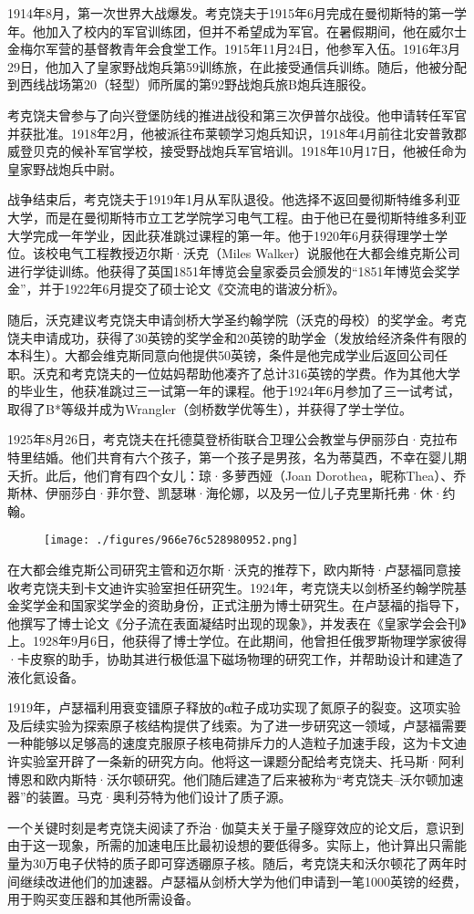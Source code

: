 1914年8月，第一次世界大战爆发。考克饶夫于1915年6月完成在曼彻斯特的第一学年。他加入了校内的军官训练团，但并不希望成为军官。在暑假期间，他在威尔士金梅尔军营的基督教青年会食堂工作。1915年11月24日，他参军入伍。1916年3月29日，他加入了皇家野战炮兵第59训练旅，在此接受通信兵训练。随后，他被分配到西线战场第20（轻型）师所属的第92野战炮兵旅B炮兵连服役。

考克饶夫曾参与了向兴登堡防线的推进战役和第三次伊普尔战役。他申请转任军官并获批准。1918年2月，他被派往布莱顿学习炮兵知识，1918年4月前往北安普敦郡威登贝克的候补军官学校，接受野战炮兵军官培训。1918年10月17日，他被任命为皇家野战炮兵中尉。

战争结束后，考克饶夫于1919年1月从军队退役。他选择不返回曼彻斯特维多利亚大学，而是在曼彻斯特市立工艺学院学习电气工程。由于他已在曼彻斯特维多利亚大学完成一年学业，因此获准跳过课程的第一年。他于1920年6月获得理学士学位。该校电气工程教授迈尔斯·沃克（Miles Walker）说服他在大都会维克斯公司进行学徒训练。他获得了英国1851年博览会皇家委员会颁发的“1851年博览会奖学金”，并于1922年6月提交了硕士论文《交流电的谐波分析》。

随后，沃克建议考克饶夫申请剑桥大学圣约翰学院（沃克的母校）的奖学金。考克饶夫申请成功，获得了30英镑的奖学金和20英镑的助学金（发放给经济条件有限的本科生）。大都会维克斯同意向他提供50英镑，条件是他完成学业后返回公司任职。沃克和考克饶夫的一位姑妈帮助他凑齐了总计316英镑的学费。作为其他大学的毕业生，他获准跳过三一试第一年的课程。他于1924年6月参加了三一试考试，取得了B*等级并成为Wrangler（剑桥数学优等生），并获得了学士学位。

1925年8月26日，考克饶夫在托德莫登桥街联合卫理公会教堂与伊丽莎白·克拉布特里结婚。他们共育有六个孩子，第一个孩子是男孩，名为蒂莫西，不幸在婴儿期夭折。此后，他们育有四个女儿：琼·多萝西娅（Joan Dorothea，昵称Thea）、乔斯林、伊丽莎白·菲尔登、凯瑟琳·海伦娜，以及另一位儿子克里斯托弗·休·约翰。

\begin{figure}[ht]
\centering
\texttt{[image: ./figures/966e76c528980952.png]}
\caption{} \label{fig_YHkrf_2}
\end{figure}
在大都会维克斯公司研究主管和迈尔斯·沃克的推荐下，欧内斯特·卢瑟福同意接收考克饶夫到卡文迪许实验室担任研究生。1924年，考克饶夫以剑桥圣约翰学院基金奖学金和国家奖学金的资助身份，正式注册为博士研究生。在卢瑟福的指导下，他撰写了博士论文《分子流在表面凝结时出现的现象》，并发表在《皇家学会会刊》上。1928年9月6日，他获得了博士学位。在此期间，他曾担任俄罗斯物理学家彼得·卡皮察的助手，协助其进行极低温下磁场物理的研究工作，并帮助设计和建造了液化氦设备。

1919年，卢瑟福利用衰变镭原子释放的α粒子成功实现了氮原子的裂变。这项实验及后续实验为探索原子核结构提供了线索。为了进一步研究这一领域，卢瑟福需要一种能够以足够高的速度克服原子核电荷排斥力的人造粒子加速手段，这为卡文迪许实验室开辟了一条新的研究方向。他将这一课题分配给考克饶夫、托马斯·阿利博恩和欧内斯特·沃尔顿研究。他们随后建造了后来被称为“考克饶夫–沃尔顿加速器”的装置。马克·奥利芬特为他们设计了质子源。

一个关键时刻是考克饶夫阅读了乔治·伽莫夫关于量子隧穿效应的论文后，意识到由于这一现象，所需的加速电压比最初设想的要低得多。实际上，他计算出只需能量为30万电子伏特的质子即可穿透硼原子核。随后，考克饶夫和沃尔顿花了两年时间继续改进他们的加速器。卢瑟福从剑桥大学为他们申请到一笔1000英镑的经费，用于购买变压器和其他所需设备。